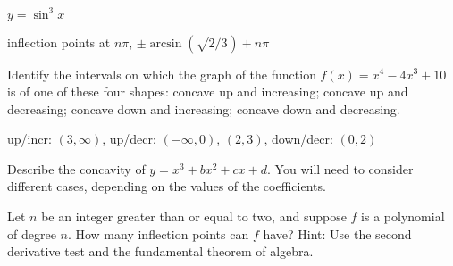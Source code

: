 \begin{exercises}
\begin{exercise} $y = \sin^3 x$
\begin{answer} inflection points at $n\pi$, $\pm\arcsin(\sqrt{2/3})+n\pi$
\end{answer}\end{exercise}

\endtwocol

\msk \begin{exercise} Identify the intervals on which the graph of the function
$f(x) = x^4-4x^3 +10$ is of one of these four
shapes: concave up and increasing; concave up and decreasing; concave
down and increasing; concave down and decreasing.
\begin{answer} up/incr: $(3,\infty)$, up/decr: $(-\infty,0)$, $(2,3)$,
down/decr: $(0,2)$
\end{answer}\end{exercise}

\begin{exercise} Describe the concavity of $y =  x^3 + bx^2 + cx + d$.
You will need to consider different cases, depending on the values of
the coefficients.
\end{exercise}

\begin{exercise} Let $n$ be an integer greater than or equal to
two, and suppose $f$ is a polynomial of degree $n$. How many inflection points
can $f$ have?  Hint: Use the second derivative test and the
fundamental theorem of algebra.
\end{exercise}


\end{exercises}
